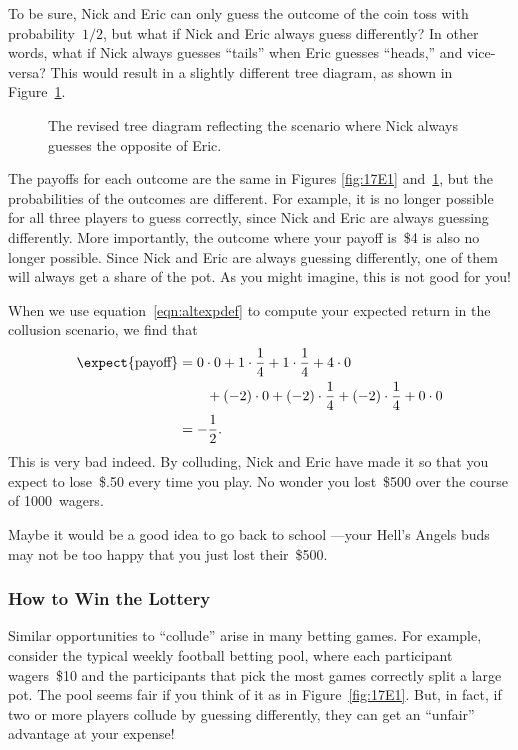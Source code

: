 To be sure, Nick and Eric can only guess the outcome of the coin toss
with probability~$1/2$, but what if Nick and Eric always guess
differently?  In other words, what if Nick always guesses ``tails''
when Eric guesses ``heads,'' and vice-versa?  This would result in a
slightly different tree diagram, as shown in Figure~\ref{fig:17E2}.

\begin{figure}


\caption{The revised tree diagram reflecting the scenario where Nick
  always guesses the opposite of Eric.}

\label{fig:17E2}

\end{figure}

The payoffs for each outcome are the same in Figures \ref{fig:17E1}
and~\ref{fig:17E2}, but the probabilities of the outcomes are
different.  For example, it is no longer possible for all three
players to guess correctly, since Nick and Eric are always guessing
differently.  More importantly, the outcome where your payoff is~\$4
is also no longer possible.  Since Nick and Eric are always guessing
differently, one of them will always get a share of the pot.  As you
might imagine, this is not good for you!

When we use equation~\ref{eqn:altexpdef} to compute your expected
return in the collusion scenario, we find that
\begin{align*}
\expect{\text{payoff}}
    &= 0 \cdot 0 + 1 \cdot \frac{1}{4} + 1 \cdot \frac{1}{4}
        + 4 \cdot 0 \\
        & \qquad {}+ (-2) \cdot 0 + (-2) \cdot \frac{1}{4}
        + (-2) \cdot \frac{1}{4}
        + 0 \cdot 0 \\
    &= -\frac{1}{2}.
\end{align*}
This is very bad indeed.  By colluding, Nick and Eric have made it so
that you expect to lose~\$.50 every time you play.  No wonder you
lost~\$500 over the course of 1000~wagers.  

Maybe it would be a good idea to go back to school ---your Hell's
Angels buds may not be too happy that you just lost their~\$500.

\subsubsection{How to Win the Lottery}

Similar opportunities to ``collude'' arise in many betting games.
For example, consider the typical weekly football betting pool, where
each participant wagers~\$10 and the participants that pick the most
games correctly split a large pot.  The pool seems fair if you think
of it as in Figure~\ref{fig:17E1}.  But, in fact, if two or more
players collude by guessing differently, they can get an
``unfair'' advantage at your expense!


